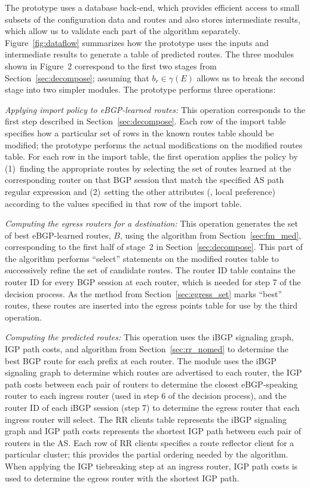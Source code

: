 The prototype uses a database back-end,
which provides efficient access to small subsets of the configuration
data and routes and also stores intermediate results, which allow us to
validate each part of the algorithm separately.
Figure~\ref{fig:dataflow} summarizes how the prototype uses the inputs
and intermediate results to generate a table of predicted routes.  The
three modules shown in Figure~2 correspond to the first two stages from
Section~\ref{sec:decompose}; assuming that $b_r \in \gamma(E)$ allows us
to break the second stage into two simpler modules.  The prototype
performs three operations:

{\em Applying import policy to eBGP-learned routes:} This operation
corresponds to the first step described in Section~\ref{sec:decompose}.
Each row of the {\mfc import} table specifies how a particular set of
rows in the {\mfc known routes} table should be modified; the prototype
performs the actual modifications on the {\dfc modified routes} table.
For each row in the {\mfc import} table, the first operation applies the
policy by (1)~finding the appropriate routes by selecting the set of
routes learned at the corresponding router on that BGP session that
match the specified AS path regular expression and (2)~setting the other
attributes (\eg, local preference) according to the values specified in
that row of the {\mfc import} table.

{\em Computing the egress routers for a destination:} This operation
generates the set of best eBGP-learned routes, $B$, using the
algorithm from Section~\ref{sec:fm_med},
corresponding to the first half of stage~2 in
Section~\ref{sec:decompose}.  
This part of the algorithm performs 
``select'' statements on the {\dfc modified routes} table to successively
refine the set of candidate routes.  The {\mfc router ID} table contains
the router ID for every BGP session at each router, which is needed for
step 7 of the decision process.  As the method from
Section~\ref{sec:egress_set} marks ``best'' routes, these routes are
inserted into the {\dfc egress points} table for use by the third
operation.

{\em Computing the predicted routes:} This operation uses the iBGP
signaling graph, IGP path costs, and algorithm from
Section~\ref{sec:rr_nomed} to determine the best BGP route for each
prefix at each router.  The module uses the iBGP signaling graph to
determine which routes are advertised to each router, the IGP path costs
between each pair of routers to determine the closest eBGP-speaking
router to each ingress router (used in step 6 of the decision process),
and the router ID of each iBGP session (step 7) to determine the egress
router that each ingress router will select.  The {\mfc RR clients} table
represents the iBGP signaling graph and {\mfc IGP path costs} represents
the shortest IGP path between each pair of routers in the AS.  Each row
of {\mfc RR clients} specifies a route reflector client for a particular
cluster; this provides the partial ordering needed by the algorithm.
When applying the IGP tiebreaking step at an ingress router, {\mfc IGP
path costs} is used to determine the egress router with the shortest IGP
path.


